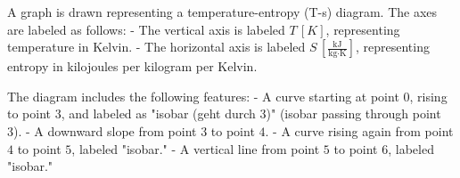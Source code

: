 A graph is drawn representing a temperature-entropy (T-s) diagram. The axes are labeled as follows:  
- The vertical axis is labeled \( T \, [K] \), representing temperature in Kelvin.  
- The horizontal axis is labeled \( S \, \left[\frac{\text{kJ}}{\text{kg·K}}\right] \), representing entropy in kilojoules per kilogram per Kelvin.  

The diagram includes the following features:  
- A curve starting at point \( 0 \), rising to point \( 3 \), and labeled as "isobar (geht durch 3)" (isobar passing through point 3).  
- A downward slope from point \( 3 \) to point \( 4 \).  
- A curve rising again from point \( 4 \) to point \( 5 \), labeled "isobar."  
- A vertical line from point \( 5 \) to point \( 6 \), labeled "isobar."